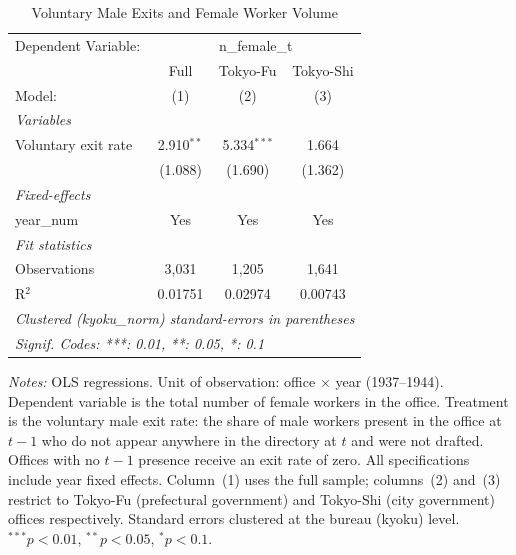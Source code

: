 \begin{table}[htbp]
\centering
\caption{Voluntary Male Exits and Female Worker Volume}
\label{tab:voluntary-exits}
\small
\begin{threeparttable}
\begin{tabular}{lccc}
   \tabularnewline \midrule \midrule
   Dependent Variable: & \multicolumn{3}{c}{n\_female\_t}\\
                       & Full         & Tokyo-Fu      & Tokyo-Shi \\   
   Model:              & (1)          & (2)           & (3)\\  
   \midrule
   \emph{Variables}\\
   Voluntary exit rate & 2.910$^{**}$ & 5.334$^{***}$ & 1.664\\   
                       & (1.088)      & (1.690)       & (1.362)\\   
   \midrule
   \emph{Fixed-effects}\\
   year\_num           & Yes          & Yes           & Yes\\  
   \midrule
   \emph{Fit statistics}\\
   Observations        & 3,031        & 1,205         & 1,641\\  
   R$^2$               & 0.01751      & 0.02974       & 0.00743\\  
   \midrule \midrule
   \multicolumn{4}{l}{\emph{Clustered (kyoku\_norm) standard-errors in parentheses}}\\
   \multicolumn{4}{l}{\emph{Signif. Codes: ***: 0.01, **: 0.05, *: 0.1}}\\
\end{tabular}
\begin{tablenotes}[flushleft]
\footnotesize
\item \textit{Notes:} OLS regressions. Unit of observation: office $\times$ year (1937--1944). Dependent variable is the total number of female workers in the office. Treatment is the voluntary male exit rate: the share of male workers present in the office at $t-1$ who do not appear anywhere in the directory at $t$ and were not drafted. Offices with no $t-1$ presence receive an exit rate of zero. All specifications include year fixed effects. Column~(1) uses the full sample; columns~(2) and~(3) restrict to Tokyo-Fu (prefectural government) and Tokyo-Shi (city government) offices respectively. Standard errors clustered at the bureau (kyoku) level. $^{***}p<0.01$, $^{**}p<0.05$, $^{*}p<0.1$.
\end{tablenotes}
\end{threeparttable}
\end{table}
